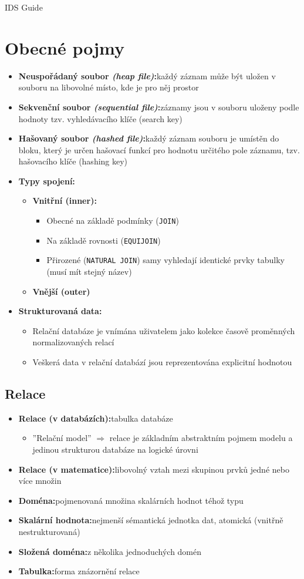 \documentclass[a4paper,10pt]{article}
\newcommand{\pojem}[2]{\item \textbf{#1:}\quad #2}
\newcommand{\tedy}{$\Rightarrow$ }
\begin{document}
	{\Huge IDS Guide} \\[1cm]
	
	\vfill
	\tableofcontents

	\newpage
	\section{Obecné pojmy}
		\begin{itemize}

			\pojem{Neuspořádaný soubor \emph{(heap file)}}{každý záznam může být uložen v souboru na libovolné místo, kde je pro něj prostor}
			\pojem{Sekvenční soubor \emph{(sequential file)}}{záznamy jsou v souboru uloženy podle hodnoty tzv. vyhledávacího klíče (search key)}
			\pojem{Hašovaný soubor \emph{(hashed file)}}{každý záznam souboru je umístěn do bloku, který je určen hašovací funkcí pro hodnotu určitého pole záznamu, tzv. hašovacího klíče (hashing key)}
			
			\pojem{Typy spojení}
			\begin{itemize}
				\pojem{Vnitřní (inner)}
				\begin{itemize}
					\item Obecné na základě podmínky (\texttt{JOIN})
					\item Na základě rovnosti (\texttt{EQUIJOIN})
					\item Přirozené (\texttt{NATURAL JOIN}) samy vyhledají identické prvky tabulky (musí mít stejný název)
				\end{itemize}
				\item \textbf{Vnější (outer)}
			\end{itemize}

			\pojem{Strukturovaná data}
			\begin{itemize}
				\item Relační databáze je vnímána uživatelem jako kolekce časově proměnných normalizovaných relací
				\item Veškerá data v relační databází jsou reprezentována explicitní hodnotou 
			\end{itemize}
		\end{itemize}

		\subsection{Relace}
			\begin{itemize}
				\pojem{Relace (v databázích)}{tabulka databáze}
				\begin{itemize}
					\item ''Relační model'' \tedy relace je základním abstraktním pojmem modelu a jedinou strukturou databáze na logické úrovni
				\end{itemize}
				\pojem{Relace (v matematice)}{libovolný vztah mezi skupinou prvků jedné nebo více množin}

				\pojem{Doména}{pojmenovaná množina skalárních hodnot téhož typu}
				\pojem{Skalární hodnota}{nejmenší sémantická jednotka dat, atomická (vnitřně nestrukturovaná)}
				\pojem{Složená doména}{z několika jednoduchých domén}
				\pojem{Tabulka}{forma znázornění relace}
			\end{itemize}
\end{document}
